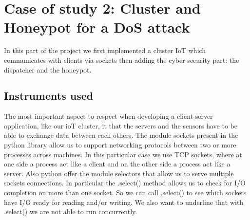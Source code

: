 \section{Case of study 2: Cluster and Honeypot for a DoS attack}

In this part of the project  we first implemented a cluster IoT which communicates with clients via sockets then adding the cyber security part: the dispatcher and the honeypot.

\subsection{Instruments used}
 The most important aspect to respect when developing a client-server application, like our ioT cluster, it that the servers and the sensors have to be able to exchange data 
between each others. The module sockets present in  the python library allow us to support networking protocols between two or more processes across machines. In this particular case we use TCP sockets, where at one side a process act like a client and on the other side a process act like a server. Also python offer the module selectors that allow us to serve multiple sockets connections. In particular the .select() method allows us to check for I/O completion on more than one socket. So we can call .select() to see which sockets have I/O ready for reading and/or writing.  We also want to underline that with .select()  we are not able to run concurrently. 

